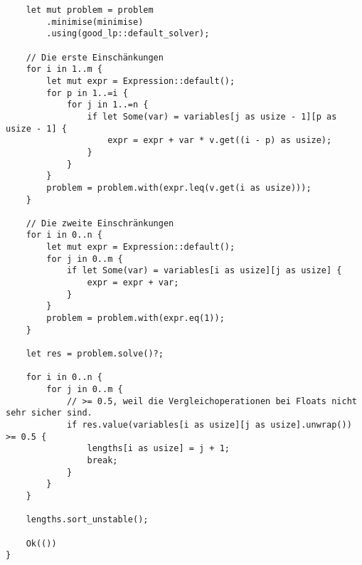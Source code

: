 \begin{lstlisting}
    let mut problem = problem
        .minimise(minimise)
        .using(good_lp::default_solver);

    // Die erste Einschänkungen
    for i in 1..m {
        let mut expr = Expression::default();
        for p in 1..=i {
            for j in 1..=n {
                if let Some(var) = variables[j as usize - 1][p as usize - 1] {
                    expr = expr + var * v.get((i - p) as usize);
                }
            }
        }
        problem = problem.with(expr.leq(v.get(i as usize)));
    }

    // Die zweite Einschränkungen
    for i in 0..n {
        let mut expr = Expression::default();
        for j in 0..m {
            if let Some(var) = variables[i as usize][j as usize] {
                expr = expr + var;
            }
        }
        problem = problem.with(expr.eq(1));
    }

    let res = problem.solve()?;

    for i in 0..n {
        for j in 0..m {
            // >= 0.5, weil die Vergleichoperationen bei Floats nicht sehr sicher sind.
            if res.value(variables[i as usize][j as usize].unwrap()) >= 0.5 {
                lengths[i as usize] = j + 1;
                break;
            }
        }
    }

    lengths.sort_unstable();

    Ok(())
}
\end{lstlisting}
